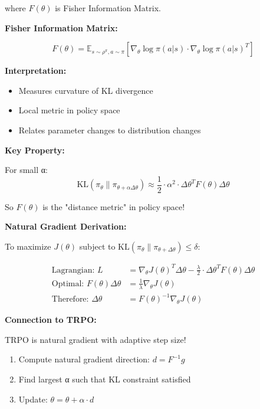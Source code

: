 \documentclass[12pt]{article}
\begin{document}
{{where $F(\theta)$ is Fisher Information Matrix.

\textbf{Fisher Information Matrix:}

\begin{equation}
F(\theta) = \mathbb{E}_{s \sim \rho^\pi, a \sim \pi} [\nabla_\theta \log \pi(a|s) \cdot \nabla_\theta \log \pi(a|s)^T]
\end{equation}

\textbf{Interpretation:}
\begin{itemize}
\item Measures curvature of KL divergence
\item Local metric in policy space
\item Relates parameter changes to distribution changes
\end{itemize}

\textbf{Key Property:}

For small α:
\begin{equation}
\text{KL}(\pi_\theta \| \pi_{\theta+\alpha\Delta\theta}) \approx \frac{1}{2} \cdot \alpha^2 \cdot \Delta\theta^T F(\theta) \Delta\theta
\end{equation}

So $F(\theta)$ is the "distance metric" in policy space!

\textbf{Natural Gradient Derivation:}

To maximize $J(\theta)$ subject to $\text{KL}(\pi_\theta \| \pi_{\theta+\Delta\theta}) \leq \delta$:

\begin{align}
\text{Lagrangian: } L &= \nabla_\theta J(\theta)^T \Delta\theta - \frac{\lambda}{2} \cdot \Delta\theta^T F(\theta) \Delta\theta \\
\text{Optimal: } F(\theta) \Delta\theta &= \frac{1}{\lambda} \nabla_\theta J(\theta) \\
\text{Therefore: } \Delta\theta &= F(\theta)^{-1} \nabla_\theta J(\theta)
\end{align}

\textbf{Connection to TRPO:}

TRPO is natural gradient with adaptive step size!

\begin{enumerate}
\item Compute natural gradient direction: $d = F^{-1} g$
\item Find largest α such that KL constraint satisfied
\item Update: $\theta = \theta + \alpha \cdot d$
\end{enumerate}

}}
\end{document}
